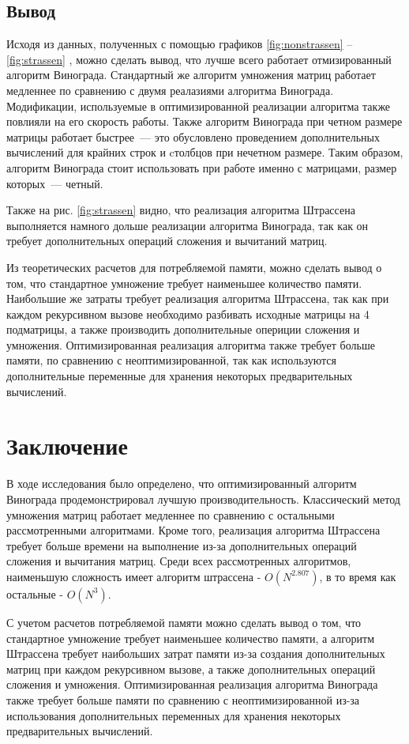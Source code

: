 \section*{Вывод}
Исходя из данных, полученных с помощью графиков \ref{fig:nonstrassen} --\ref{fig:strassen} , можно сделать вывод, что лучше всего работает отмизированный алгоритм Винограда.
Стандартный же алгоритм умножения матриц работает медленнее по сравнению с двумя реалазиями алгоритма Винограда.
Модификации, используемые в оптимизированной реализации алгоритма также повлияли на его скорость работы. 
Также алгоритм Винограда при четном размере матрицы работает быстрее~--- это обусловлено проведением дополнительных вычислений для крайних строк и cтолбцов при нечетном размере. 
Таким образом, алгоритм Винограда стоит использовать при работе именно с матрицами, размер которых~--- четный.

Также на рис. \ref{fig:strassen} видно, что реализация алгоритма Штрассена выполняется намного дольше реализации алгоритма Винограда, так как он требует дополнительных операций сложения и вычитаний матриц.

Из теоретических расчетов для потребляемой памяти, можно сделать вывод о том, что стандартное умножение требует наименьшее количество памяти. 
Наибольшие же затраты требует реализация алгоритма Штрассена, так как при каждом рекурсивном вызове необходимо разбивать исходные матрицы на 4 подматрицы, а также производить дополнительные опериции сложения и умножения.
Оптимизированная реализация алгоритма также требует больше памяти, по сравнению с неоптимизированной, так как используются дополнительные переменные для хранения некоторых предварительных вычислений.

\chapter*{Заключение}

В ходе исследования было определено, что оптимизированный алгоритм Винограда продемонстрировал лучшую производительность. 
Классический метод умножения матриц работает медленнее по сравнению с остальными рассмотренными алгоритмами. 
Кроме того, реализация алгоритма Штрассена требует больше времени на выполнение из-за дополнительных операций сложения и вычитания матриц.
Среди всех рассмотренных алгоритмов, наименьшую сложность имеет алгоритм штрассена - $O(N^{2.807})$, в то время как остальные - $O(N^3)$.

С учетом расчетов потребляемой памяти можно сделать вывод о том, что стандартное умножение требует наименьшее количество памяти, а алгоритм Штрассена требует наибольших затрат памяти из-за создания дополнительных матриц при каждом рекурсивном вызове, а также дополнительных операций сложения и умножения. 
Оптимизированная реализация алгоритма Винограда также требует больше памяти по сравнению с неоптимизированной из-за использования дополнительных переменных для хранения некоторых предварительных вычислений. 

